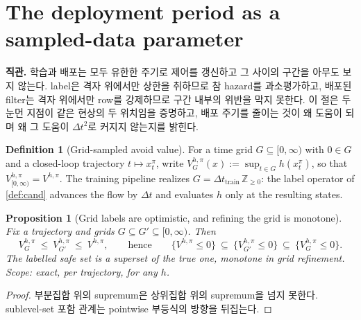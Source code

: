 \documentclass[11pt]{article}
\theoremstyle{plain}
\newtheorem{proposition}[theorem]{Proposition}
\theoremstyle{definition}
\newtheorem{definition}[theorem]{Definition}
\theoremstyle{remark}
\newcommand{\eqdef}{:=}
\begin{document}
\section{The deployment period as a sampled-data parameter}\label{sec:dt}

\textbf{직관.} 학습과 배포는 모두 유한한 주기로 제어를 갱신하고 그 사이의 구간을 아무도 보지
않는다. label은 격자 위에서만 상한을 취하므로 참 hazard를 과소평가하고, 배포된 filter는 격자
위에서만 row를 강제하므로 구간 내부의 위반을 막지 못한다. 이 절은 두 눈먼 지점이 같은 현상의 두
위치임을 증명하고, 배포 주기를 줄이는 것이 왜 도움이 되며 왜 그 도움이 $\Delta t^2$로 커지지
않는지를 밝힌다.

\begin{definition}[Grid-sampled avoid value]\label{def:grid-value}
For a time grid $G\subseteq[0,\infty)$ with $0\in G$ and a closed-loop trajectory
$t\mapsto x^\pi_t$, write $V^{h,\pi}_G(x)\eqdef\sup_{t\in G}h(x^\pi_t)$, so that
$V^{h,\pi}_{[0,\infty)}=V^{h,\pi}$. The training pipeline realizes
$G=\Delta t_{\mathrm{train}}\,\mathbb Z_{\ge0}$: the label operator of \cref{def:cand} advances
the flow by $\Delta t$ and evaluates $h$ only at the resulting states.
\end{definition}

\begin{proposition}[Grid labels are optimistic, and refining the grid is monotone]\label{prop:grid-optimism}
Fix a trajectory and grids $G\subseteq G'\subseteq[0,\infty)$. Then
\begin{equation}
V^{h,\pi}_G\ \le\ V^{h,\pi}_{G'}\ \le\ V^{h,\pi},
\qquad\text{hence}\qquad
\{V^{h,\pi}\le0\}\ \subseteq\ \{V^{h,\pi}_{G'}\le0\}\ \subseteq\ \{V^{h,\pi}_{G}\le0\}.
\end{equation}
The labelled safe set is a \emph{superset} of the true one, monotone in grid refinement.
Scope: exact, per trajectory, for any $h$.
\end{proposition}
\begin{proof}
부분집합 위의 supremum은 상위집합 위의 supremum을 넘지 못한다. sublevel-set 포함 관계는 pointwise
부등식의 방향을 뒤집는다.
\end{proof}
\end{document}
